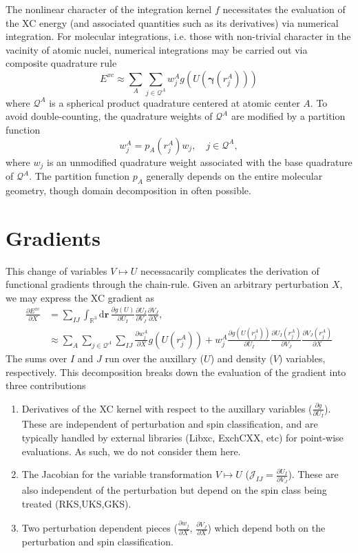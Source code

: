 \documentclass[11pt]{article}
\newcommand{\opdm}[0]{\boldsymbol{\gamma}}
\newcommand{\dd}[1]{\mathrm{d}{#1}\,}
\begin{document}
The nonlinear character of the integration kernel $f$ necessitates the evaluation of the XC energy (and associated
quantities such as its derivatives) via numerical integration. For molecular integrations, i.e. those with non-trivial
character in the vacinity of atomic nuclei, numerical integrations may be carried out via composite quadrature rule
\begin{equation}
E^{xc} \approx \sum_A \sum_{j \in \mathcal{Q}^A} w^A_j g(U(\opdm(r^A_j)))
\end{equation}
where $\mathcal{Q}^A$ is a spherical product quadrature centered at atomic center $A$. To avoid double-counting, the
quadrature weights of $\mathcal{Q}^A$ are modified by a partition function
\begin{equation}
w^A_j = p_A(r^A_j) w_j, \quad j \in \mathcal{Q}^A,
\end{equation}
where $w_j$ is an unmodified quadrature weight associated with the base quadrature of $\mathcal{Q}^A$. The partition function
$p_A$ generally depends on the entire molecular geometry, though domain decomposition in often possible.


\section{Gradients}

This change of variables $V\mapsto U$ necessacarily complicates the derivation of functional gradients
through the chain-rule.  Given an arbitrary perturbation $X$, we may express the XC gradient as
\begin{align}
\frac{\partial E^{xc}}{\partial X} &=
\sum_{IJ} \int_{\mathbb{R}^3} \dd{\mathbf{r}} \frac{\partial g(U)}{\partial U_I} \frac{\partial U_I}{\partial V_J} \frac{\partial V_J}{\partial X}, \\
&\approx \sum_A \sum_{j\in\mathcal{Q}^A} \sum_{IJ} \frac{\partial w_j^A}{\partial X} g(U(r_j^A)) + w_j^A\frac{\partial g(U(r_j^A))}{\partial U_I} \frac{\partial U_I(r_j^A)}{\partial V_J} \frac{\partial V_J(r^A_j)}{\partial X}
\end{align}
The sums over $I$ and $J$ run over the auxillary ($U$) and density ($V$) variables,
respectively. This decomposition breaks down the evaluation of the gradient into three contributions
\begin{enumerate}
  \item Derivatives of the XC kernel with respect to the auxillary variables ($\frac{\partial g}{\partial U_I}$). These are independent of perturbation and spin
        classification, and are typically handled by external libraries (Libxc, ExchCXX, etc) for point-wise evaluations. As such, we do not consider them here.
  \item The Jacobian for the variable transformation $V\mapsto U$ ($\mathcal{J}_{IJ} = \frac{\partial U_I}{\partial V_J}$). These are also independent of the
        perturbation but depend on the spin class being treated (RKS,UKS,GKS).
  \item Two perturbation dependent pieces ($\frac{\partial w_j}{\partial X}$, $\frac{\partial V_J}{\partial X}$) which depend both on the perturbation and
        spin classification. 
\end{enumerate}
\end{document}
